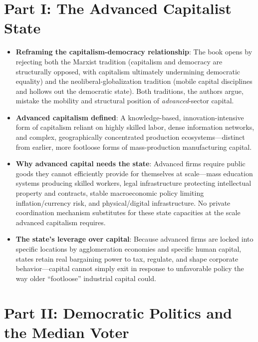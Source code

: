 \documentclass[12pt]{article}
\begin{document}
\section{Part I: The Advanced Capitalist State}

\begin{itemize}[leftmargin=*, itemsep=4pt]
    \item \textbf{Reframing the capitalism-democracy relationship}: The book opens by rejecting both the Marxist tradition (capitalism and democracy are structurally opposed, with capitalism ultimately undermining democratic equality) and the neoliberal-globalization tradition (mobile capital disciplines and hollows out the democratic state). Both traditions, the authors argue, mistake the mobility and structural position of \textit{advanced}-sector capital.
    \item \textbf{Advanced capitalism defined}: A knowledge-based, innovation-intensive form of capitalism reliant on highly skilled labor, dense information networks, and complex, geographically concentrated production ecosystems---distinct from earlier, more footloose forms of mass-production manufacturing capital.
    \item \textbf{Why advanced capital needs the state}: Advanced firms require public goods they cannot efficiently provide for themselves at scale---mass education systems producing skilled workers, legal infrastructure protecting intellectual property and contracts, stable macroeconomic policy limiting inflation/currency risk, and physical/digital infrastructure. No private coordination mechanism substitutes for these state capacities at the scale advanced capitalism requires.
    \item \textbf{The state's leverage over capital}: Because advanced firms are locked into specific locations by agglomeration economies and specific human capital, states retain real bargaining power to tax, regulate, and shape corporate behavior---capital cannot simply exit in response to unfavorable policy the way older ``footloose'' industrial capital could.
\end{itemize}

\section{Part II: Democratic Politics and the Median Voter}
\end{document}
